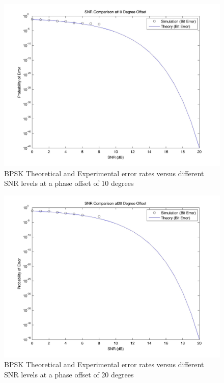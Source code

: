 \documentclass[]{article}
\begin{document}
\begin{figure}[H]
\centering
\hspace*{-2cm}\includegraphics[width=1.3\textwidth]{bpSNRpo2.jpg}
\caption{BPSK Theoretical and Experimental error rates versus different SNR levels at a phase offset of 10 degrees }
\end{figure}


\begin{figure}[H]
\centering
\hspace*{-2cm}\includegraphics[width=1.3\textwidth]{bpSNRpo3.jpg}
\caption{BPSK Theoretical and Experimental error rates versus different SNR levels at a phase offset of 20 degrees }
\end{figure}
\end{document}

